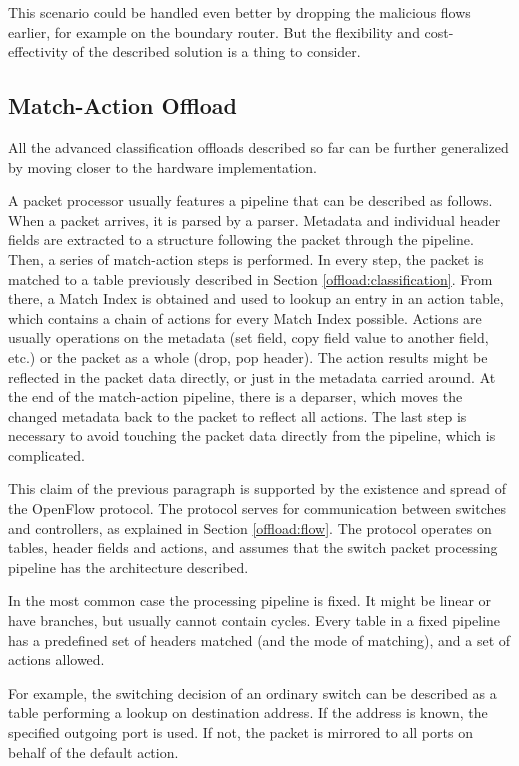 This scenario could be handled even better by dropping the malicious flows earlier, for
example on the boundary router. But the flexibility and cost-effectivity of the
described solution is a thing to consider.

\subsection{Match-Action Offload}
\label{offload:match-action}

All the advanced classification offloads described so far can be further
generalized by moving closer to the hardware implementation.

A packet processor usually features a pipeline that can be described as
follows. When a packet arrives, it is parsed by a parser. Metadata and
individual header fields are extracted to a structure following the packet
through the pipeline. Then, a series of match-action steps is performed. In
every step, the packet is matched to a table previously described in Section
\ref{offload:classification}. From there, a Match
Index is obtained and used to lookup an entry in an action table, which
contains a chain of actions for every Match Index possible. Actions are usually
operations on the metadata (set field, copy field value to another field, etc.)
or the packet as a whole (drop, pop header). The action results might be
reflected in the packet data directly, or just in the metadata carried around.
At the end of the match-action pipeline, there is a deparser, which moves
the changed metadata back to the packet to reflect all actions. The last step is
necessary to avoid touching the packet data directly from the pipeline, which
is complicated.

This claim of the previous paragraph is supported by the existence and spread of the OpenFlow \cite{openflow}
protocol. The protocol serves for communication between switches and 
controllers, as explained in Section \ref{offload:flow}. The protocol operates
on tables, header fields and actions, and assumes that the switch packet
processing pipeline has the architecture described.

In the most common case the processing pipeline is fixed. It might be
linear or have branches, but usually cannot contain cycles. Every table in
a fixed pipeline has a predefined set of headers matched (and the mode of
matching), and a set of actions allowed.

For example, the switching decision of an ordinary switch can be described as a table
performing a lookup on destination  address. If the address is known,
the specified outgoing port is used. If not, the packet is mirrored to all
ports on behalf of the default action.


